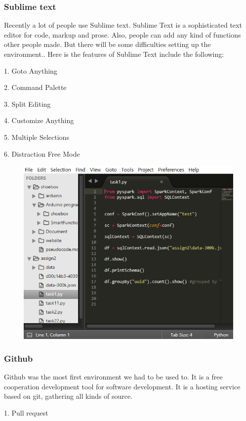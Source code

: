 \documentclass[conference]{IEEEtran}
\begin{document}
\subsubsection{Sublime text}
Recently a lot of people use Sublime text. Sublime Text is a sophisticated text editor for code, markup and prose. Also, people can add any kind of functions other people made. But there will be some difficulties setting up the environment.. Here is the features of Sublime Text include the following: 

1. Goto Anything

2. Command Palette

3. Split Editing

4. Customize Anything

5. Multiple Selections

6. Distraction Free Mode
\begin{figure}[H]
\begin{center}
    \includegraphics[scale=0.6]{st}
    \label{fig:label}
\end{center}
\end{figure}
\subsubsection{Github}
Github was the most first environment we had to be used to. It is a free cooperation development tool for software development. It is a hosting service based on git, gathering all kinds of source.

1. Pull request
\end{document}
